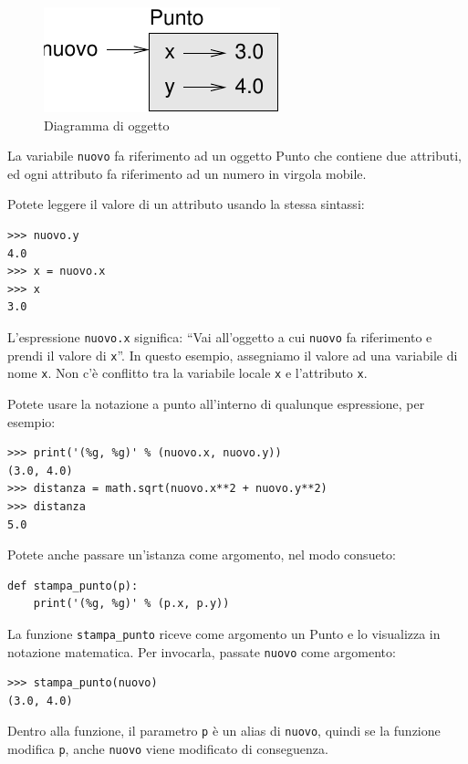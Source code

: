 \documentclass[10pt]{book}
\begin{document}
\begin{figure}
\centerline
{\includegraphics[scale=0.8]{figs/point.pdf}}
\caption{Diagramma di oggetto}
\label{fig.point}
\end{figure}


La variabile {\tt nuovo} fa riferimento ad un oggetto Punto che contiene due
   attributi, ed ogni attributo fa riferimento ad un numero in virgola mobile.

Potete leggere il valore di un attributo usando la stessa sintassi:

\begin{verbatim}
>>> nuovo.y
4.0
>>> x = nuovo.x
>>> x
3.0
\end{verbatim}
%
L'espressione {\tt nuovo.x} significa: ``Vai all'oggetto a cui {\tt nuovo}
fa riferimento e prendi il valore di {\tt x}''. In questo esempio, assegniamo il valore ad una variabile di nome {\tt x}. Non c'è conflitto tra la variabile locale {\tt x} e l'attributo {\tt x}.

Potete usare la notazione a punto all'interno di qualunque espressione, per esempio:

\begin{verbatim}
>>> print('(%g, %g)' % (nuovo.x, nuovo.y))
(3.0, 4.0)
>>> distanza = math.sqrt(nuovo.x**2 + nuovo.y**2)
>>> distanza
5.0
\end{verbatim}
%
Potete anche passare un'istanza come argomento, nel modo consueto:

\begin{verbatim}
def stampa_punto(p):
    print('(%g, %g)' % (p.x, p.y))
\end{verbatim}
%
La funzione \verb"stampa_punto" riceve come argomento un Punto e lo visualizza in notazione matematica. Per invocarla, passate {\tt nuovo} come argomento:

\begin{verbatim}
>>> stampa_punto(nuovo)
(3.0, 4.0)
\end{verbatim}
%
Dentro alla funzione, il parametro {\tt p} è un alias di {\tt nuovo}, quindi se la funzione modifica {\tt p}, anche {\tt nuovo} viene modificato di conseguenza.
\end{document}
